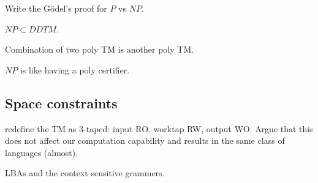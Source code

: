 Write the G\"{o}del's proof for \(P\) vs \(NP\).

\(NP \subset DDTM\).

Combination of two poly TM is another poly TM.

\(NP\) is like having a poly certifier.

\subsection{Space constraints}
redefine the TM as 3-taped: input RO, worktap RW, output WO. Argue that this does not affect our computation capability and results in the same class of languages (almost).

LBAs and the context sensitive grammers.


